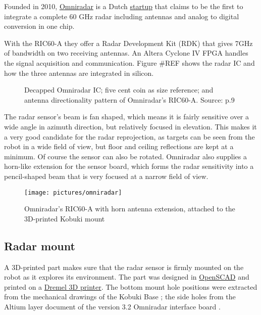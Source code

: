 Founded in 2010, \href{https://www.omniradar.com/}{Omniradar} is a Dutch
\href{https://www.crunchbase.com/organization/omniradar}{startup} that
claims to be the first to integrate a complete 60 GHz radar including
antennas and analog to digital conversion in one chip.

With the RIC60-A they offer a Radar Development Kit (RDK) that gives
7GHz of bandwidth on two receiving antennas. An Altera Cyclone IV FPGA
handles the signal acquisition and communication. Figure \#REF shows the
radar IC and how the three antennas are integrated in silicon.

\begin{figure}[htp]
    \centering
    \label{fig:slide_RIC60A}
    \def\svgwidth{\linewidth}
    
    \caption{Decapped Omniradar IC; five cent coin as size reference; and antenna directionality pattern of Omniradar's RIC60-A. Source: \cite{Brouwer2015} p.9}
\end{figure}

The radar sensor's beam is fan shaped, which means it is fairly
sensitive over a wide angle in azimuth direction, but relatively focused
in elevation. This makes it a very good candidate for the radar
reprojection, as targets can be seen from the robot in a wide field of
view, but floor and ceiling reflections are kept at a minimum. Of course
the sensor can also be rotated. Omniradar also supplies a horn-like
extension for the sensor board, which forms the radar sensitivity into a
pencil-shaped beam that is very focused at a narrow field of view.

\begin{figure}[htp]
    \centering
    \label{fig:omniradar}
    \texttt{[image: pictures/omniradar]}
    \caption{Omniradar's RIC60-A with horn antenna extension, attached to the 3D-printed Kobuki mount}
\end{figure}

\subsection{Radar mount}\label{radar-mount}

A 3D-printed part makes sure that the radar sensor is firmly mounted on
the robot as it explores its environment. The part was designed in
\href{http://www.openscad.org/}{OpenSCAD} and printed on a
\href{https://3dprinter.dremel.com/}{Dremel 3D printer}. The bottom
mount hole positions were extracted from the mechanical drawings of the
Kobuki Base \cite{YujinRobot2012}; the side holes from the Altium layer
document of the version 3.2 Omniradar interface board
\cite{Omniradar2014}.

